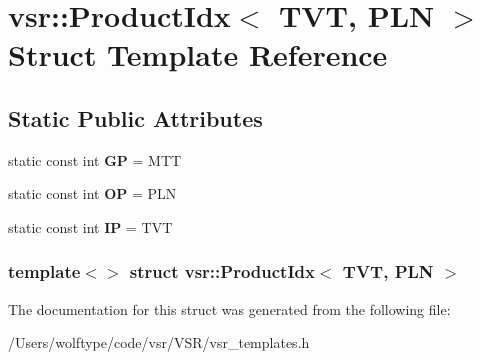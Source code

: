 \hypertarget{structvsr_1_1_product_idx_3_01_t_v_t_00_01_p_l_n_01_4}{\section{vsr\-:\-:Product\-Idx$<$ T\-V\-T, P\-L\-N $>$ Struct Template Reference}
\label{structvsr_1_1_product_idx_3_01_t_v_t_00_01_p_l_n_01_4}
}
\subsection*{Static Public Attributes}
\begin{DoxyCompactItemize}
\item 
\hypertarget{structvsr_1_1_product_idx_3_01_t_v_t_00_01_p_l_n_01_4_a0828e0f78be4d94db866cbcc96e92bc7}{static const int {\bfseries G\-P} = M\-T\-T}\label{structvsr_1_1_product_idx_3_01_t_v_t_00_01_p_l_n_01_4_a0828e0f78be4d94db866cbcc96e92bc7}

\item 
\hypertarget{structvsr_1_1_product_idx_3_01_t_v_t_00_01_p_l_n_01_4_a84cb98287a8cc98910deea4c048fd5f4}{static const int {\bfseries O\-P} = P\-L\-N}\label{structvsr_1_1_product_idx_3_01_t_v_t_00_01_p_l_n_01_4_a84cb98287a8cc98910deea4c048fd5f4}

\item 
\hypertarget{structvsr_1_1_product_idx_3_01_t_v_t_00_01_p_l_n_01_4_a69ee2cf4aa157785112a812269f5f8d4}{static const int {\bfseries I\-P} = T\-V\-T}\label{structvsr_1_1_product_idx_3_01_t_v_t_00_01_p_l_n_01_4_a69ee2cf4aa157785112a812269f5f8d4}

\end{DoxyCompactItemize}
\subsubsection*{template$<$$>$ struct vsr\-::\-Product\-Idx$<$ T\-V\-T, P\-L\-N $>$}



The documentation for this struct was generated from the following file\-:\begin{DoxyCompactItemize}
\item 
/\-Users/wolftype/code/vsr/\-V\-S\-R/vsr\-\_\-templates.\-h\end{DoxyCompactItemize}
